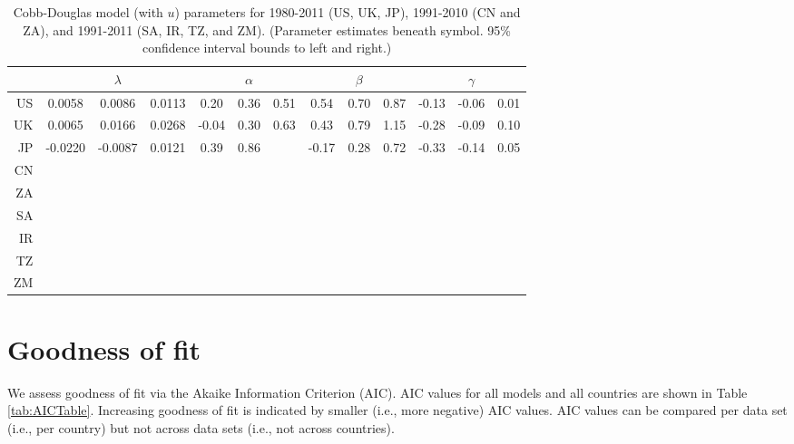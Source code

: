 \documentclass[preprint,authoryear,12pt]{elsarticle}\usepackage{graphicx, color}
\begin{document}
\begin{table}[H]
\begin{center}
\caption{Cobb-Douglas model (with $u$) parameters for 1980-2011 (US, UK, JP), 1991-2010 (CN and ZA), and 1991-2011 (SA, IR, TZ, and ZM). (Parameter estimates beneath symbol. 95\% confidence interval bounds to left and right.)}
\label{tab:CD_Parameters_With_U}
{\tiny
\begin{tabular}{r|ccc|ccc|ccc|ccc}
  \hline
 &   & $\lambda$ &   &   & $\alpha$ &   &   & $\beta$ &   &   & $\gamma$ &   \\ 
  \hline
US & 0.0058 & 0.0086 & 0.0113 & 0.20 & 0.36 & 0.51 & 0.54 & 0.70 & 0.87 & -0.13 & -0.06 & 0.01 \\ 
  UK & 0.0065 & 0.0166 & 0.0268 & -0.04 & 0.30 & 0.63 & 0.43 & 0.79 & 1.15 & -0.28 & -0.09 & 0.10 \\ 
  JP & -0.0220 & -0.0087 & 0.0121 & 0.39 & 0.86 &  & -0.17 & 0.28 & 0.72 & -0.33 & -0.14 & 0.05 \\ 
  CN &  &  &  &  &  &  &  &  &  &  &  &  \\ 
  ZA &  &  &  &  &  &  &  &  &  &  &  &  \\ 
  SA &  &  &  &  &  &  &  &  &  &  &  &  \\ 
  IR &  &  &  &  &  &  &  &  &  &  &  &  \\ 
  TZ &  &  &  &  &  &  &  &  &  &  &  &  \\ 
  ZM &  &  &  &  &  &  &  &  &  &  &  &  \\ 
   \hline
\end{tabular}
}
\end{center}
\end{table}



\section{Goodness of fit}
\setcounter{table}{0} %




We assess goodness of fit via the Akaike Information Criterion (AIC). AIC values for all models and all countries are shown in Table \ref{tab:AICTable}. Increasing goodness of fit is indicated by smaller (i.e., more negative) AIC values. AIC values can be compared per data set (i.e., per country) but not across data sets (i.e., not across countries). 
\end{document}
